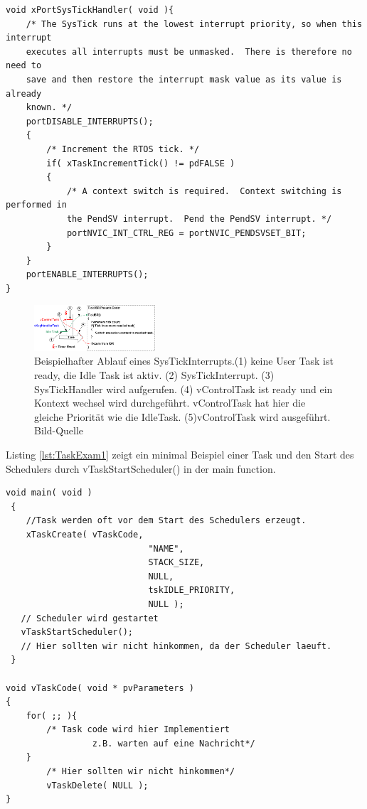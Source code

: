 \begin{lstlisting}[caption={FreeRTOS Source des SysTickHandlers aus Task.c. Der SysTickHandler verwaltet den TickCount. Der TickCount dient allen Timingfunktionen des RTOS Kernels als Zeitreferenz. Des Weiteren wird bei aktivem Time Slicing überprüft ob ein Kontextwechsel nötig ist. Der Kontext wechsel wir dann ggf. durch den PendSVHandler durchgeführt.}, linewidth=8cm,captionpos=b, label=lst:SysTickS, float=hbt]
void xPortSysTickHandler( void ){
	/* The SysTick runs at the lowest interrupt priority, so when this interrupt
	executes all interrupts must be unmasked.  There is therefore no need to
	save and then restore the interrupt mask value as its value is already
	known. */
	portDISABLE_INTERRUPTS();
	{
		/* Increment the RTOS tick. */
		if( xTaskIncrementTick() != pdFALSE )
		{
			/* A context switch is required.  Context switching is performed in
			the PendSV interrupt.  Pend the PendSV interrupt. */
			portNVIC_INT_CTRL_REG = portNVIC_PENDSVSET_BIT;
		}
	}
	portENABLE_INTERRUPTS();
}
\end{lstlisting}
\begin{figure}[htb]
	\centering
		\includegraphics[width=0.4\textwidth]{Pictures/FreeRTOSOrg/TickISR.png}
	\caption{Beispielhafter Ablauf eines SysTickInterrupts.(1) keine User Task ist ready, die Idle Task ist aktiv. (2) SysTickInterrupt. (3) SysTickHandler wird aufgerufen. (4) vControlTask ist ready und ein Kontext wechsel wird durchgeführt. vControlTask hat hier die gleiche Priorität wie die IdleTask. (5)vControlTask wird ausgeführt. Bild-Quelle~\protect{}}
	\label{fig:SysTick}
\end{figure}


Listing \ref{lst:TaskExam1} zeigt ein minimal Beispiel einer Task und den Start des Schedulers durch vTaskStartScheduler() in der main function. 
\begin{lstlisting}[caption={Minimal Beispiel für die Definition eine Task. }, linewidth=8cm,captionpos=b, label=lst:TaskExam1, float=hbt]
 void main( void )
 {
	//Task werden oft vor dem Start des Schedulers erzeugt.
	xTaskCreate( vTaskCode,
							"NAME",
							STACK_SIZE,
							NULL,
							tskIDLE_PRIORITY,
							NULL );
   // Scheduler wird gestartet
   vTaskStartScheduler();
   // Hier sollten wir nicht hinkommen, da der Scheduler laeuft.
 }

void vTaskCode( void * pvParameters )
{
    for( ;; ){
        /* Task code wird hier Implementiert
				 z.B. warten auf eine Nachricht*/
    }
		/* Hier sollten wir nicht hinkommen*/
		vTaskDelete( NULL );
}
\end{lstlisting}

